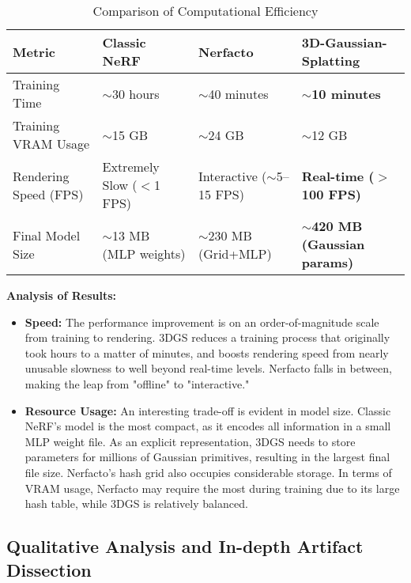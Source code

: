 \documentclass[11pt]{article}
\begin{document}
\begin{table}[h!]
\centering
\caption{Comparison of Computational Efficiency}
\label{tab:efficiency}
\begin{tabular}{|l|p{3cm}|p{3cm}|p{3.5cm}|}
\hline
\textbf{Metric} & \textbf{Classic NeRF} & \textbf{Nerfacto} & \textbf{3D-Gaussian-Splatting} \\ \hline
Training Time & $\sim$30 hours & $\sim$40 minutes & \textbf{$\sim$10 minutes} \\ \hline
Training VRAM Usage & $\sim$15 GB & $\sim$24 GB & $\sim$12 GB \\ \hline
Rendering Speed (FPS) & Extremely Slow ($<$1 FPS) & Interactive ($\sim$5--15 FPS) & \textbf{Real-time ($>$100 FPS)} \\ \hline
Final Model Size & $\sim$13 MB (MLP weights) & $\sim$230 MB (Grid+MLP) & \textbf{$\sim$420 MB (Gaussian params)} \\ \hline
\end{tabular}
\end{table}

\textbf{Analysis of Results:}
\begin{itemize}
    \item \textbf{Speed:} The performance improvement is on an order-of-magnitude scale from training to rendering. 3DGS reduces a training process that originally took hours to a matter of minutes, and boosts rendering speed from nearly unusable slowness to well beyond real-time levels. Nerfacto falls in between, making the leap from "offline" to "interactive."
    \item \textbf{Resource Usage:} An interesting trade-off is evident in model size. Classic NeRF's model is the most compact, as it encodes all information in a small MLP weight file. As an explicit representation, 3DGS needs to store parameters for millions of Gaussian primitives, resulting in the largest final file size. Nerfacto's hash grid also occupies considerable storage. In terms of VRAM usage, Nerfacto may require the most during training due to its large hash table, while 3DGS is relatively balanced.
\end{itemize}

\subsection{Qualitative Analysis and In-depth Artifact Dissection}
\end{document}
